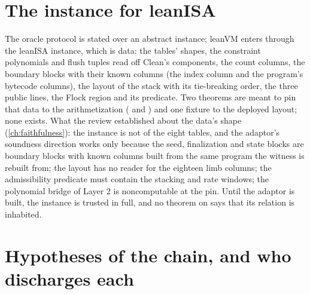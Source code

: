 \section{The instance for leanISA}

The oracle protocol is stated over an abstract instance; leanVM enters through the leanISA
instance, which is data: the tables' shapes, the constraint polynomials and flush tuples read
off Clean's components, the count columns, the boundary blocks with their known columns (the
index column and the program's bytecode columns), the layout of the stack with its
tie-breaking order, the three public lines, the Flock region and its predicate. Two theorems
are meant to pin that data to the arithmetization ( and
) and one fixture to the deployed layout; none exists. What the review
established about the data's shape (\cref{ch:faithfulness}): the instance is not
 of the eight tables, and the adaptor's soundness direction works only
because the seed, finalization and state blocks are boundary blocks with known columns built
from the same program the witness is rebuilt from; the layout has no reader for the eighteen
limb columns; the admissibility predicate must contain the stacking and rate windows; the
polynomial bridge of Layer 2 is noncomputable at the pin. Until the adaptor is built, the
instance is trusted in full, and no theorem on  says that its relation is inhabited.

\section{Hypotheses of the chain, and who discharges each}

